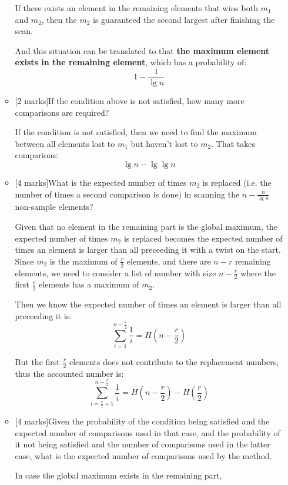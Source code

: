 \documentclass[12pt]{article}
\begin{document}
\begin{enumerate}
\begin{itemize}
If there exists an element in the remaining elements that wins both $m_{1}$ and $m_{2}$, then the $m_{2}$ is guaranteed the second largest after finishing the scan.

And this situation can be translated to that \textbf{the maximum element exists in the remaining element}, which has a probability of:
\begin{equation}
1 - \frac{1}{\lg n}
\end{equation}

\item{}[2 marks]If the condition above is not satisfied, how many more comparisons are required?

If the condition is not satisfied, then we need to find the maximum between all elements lost to $m_{1}$ but haven't lost to $m_{2}$. That takes comparions:
\begin{equation}
\lg n - \lg \lg n
\end{equation}

\item{}[4 marks]What is the expected number of times $m_{2}$ is replaced (i.e. the number of times a second comparison is done) in scanning the $n-\frac{n}{\lg n}$ non-sample elements?

Given that no element in the remaining part is the global maximum, the expected number of times $m_{2}$ is replaced becomes the expected number of times an element is larger than all preceeding it with a twist on the start. Since $m_{2}$ is the maximum of $\frac{r}{2}$ elements, and there are $n - r$ remaining elements, we need to consider a list of number with size $n - \frac{r}{2}$ where the first $\frac{r}{2}$ elements has a maximum of $m_{2}$.

Then we know the expected number of times an element is larger than all preceeding it is:
\begin{equation}
\sum_{i = 1}^{n - \frac{r}{2}}\frac{1}{i} = H(n - \frac{r}{2})
\end{equation}

But the first $\frac{r}{2}$ elements does not contribute to the replacement numbers, thus the accounted number is:
\begin{equation}
\sum_{i = \frac{r}{2} + 1}^{n - \frac{r}{2}}\frac{1}{i} = H(n - \frac{r}{2}) - H(\frac{r}{2})
\end{equation}

\item{}[4 marks]Given the probability of the condition being satisfied and the expected number of comparisons used in that case, and the probability of it not being satisfied and the number of comparisons used in the latter case, what is the expected number of comparisons used by the method.

In case the global maximum exists in the remaining part, 

\end{itemize}


\end{enumerate}
\end{document}
